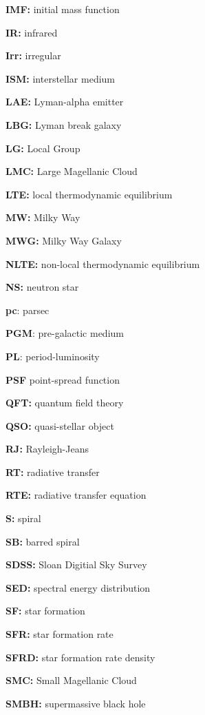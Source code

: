 \documentclass[a4paper,11pt]{article}
\begin{document}
{\noindent}\textbf{IMF:} initial mass function

{\noindent}\textbf{IR:} infrared

{\noindent}\textbf{Irr:} irregular

{\noindent}\textbf{ISM:} interstellar medium

{\noindent}\textbf{LAE:} Lyman-alpha emitter

{\noindent}\textbf{LBG:} Lyman break galaxy

{\noindent}\textbf{LG:} Local Group

{\noindent}\textbf{LMC:} Large Magellanic Cloud

{\noindent}\textbf{LTE:} local thermodynamic equilibrium

{\noindent}\textbf{MW:} Milky Way

{\noindent}\textbf{MWG:} Milky Way Galaxy

{\noindent}\textbf{NLTE:} non-local thermodynamic equilibrium

{\noindent}\textbf{NS:} neutron star

{\noindent}\textbf{pc}: parsec

{\noindent}\textbf{PGM}: pre-galactic medium

{\noindent}\textbf{PL}: period-luminosity

{\noindent}\textbf{PSF} point-spread function

{\noindent}\textbf{QFT:} quantum field theory

{\noindent}\textbf{QSO:} quasi-stellar object

{\noindent}\textbf{RJ:} Rayleigh-Jeans

{\noindent}\textbf{RT:} radiative transfer

{\noindent}\textbf{RTE:} radiative transfer equation

{\noindent}\textbf{S:} spiral

{\noindent}\textbf{SB:} barred spiral

{\noindent}\textbf{SDSS:} Sloan Digitial Sky Survey

{\noindent}\textbf{SED:} spectral energy distribution

{\noindent}\textbf{SF:} star formation

{\noindent}\textbf{SFR:} star formation rate

{\noindent}\textbf{SFRD:} star formation rate density

{\noindent}\textbf{SMC:} Small Magellanic Cloud

{\noindent}\textbf{SMBH:} supermassive black hole
\end{document}
